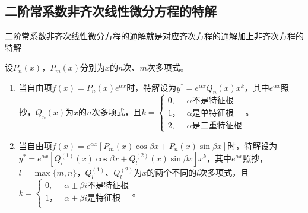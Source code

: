 \documentclass[UTF8, 12pt]{ctexart}
\begin{document}
        \subsection{二阶常系数非齐次线性微分方程的特解}

        二阶常系数非齐次线性微分方程的通解就是对应齐次方程的通解加上非齐次方程的特解

        设$P_n(x)$，$P_m(x)$分别为$x$的$n$次、$m$次多项式。

        \begin{enumerate}
            \item 当自由项$f(x)=P_n(x)e^{\alpha x}$时，特解设为$y^*=e^{\alpha x}Q_n(x)x^k$，其中$e^{\alpha x}$照抄，$Q_n(x)$为$x$的$n$次多项式，且$k=\left\{\begin{array}{ll}
                                                                                                                                                            0, & \alpha\text{不是特征根} \\
                                                                                                                                                            1， & \alpha\text{是单特征根} \\
                                                                                                                                                            2, & \alpha\text{是二重特征根}
            \end{array}\right.$。
            \item 当自由项$f(x)=e^{\alpha x}[P_m(x)\cos\beta x+P_n(x)\sin\beta x]$时，特解设为$y^*=e^{\alpha x}[Q_l^{(1)}(x)\cos\beta x+Q_l^{(2)}(x)\sin\beta x]x^k$，其中$e^{\alpha x}$照抄，$l=\max\{m,n\}$，$Q_l^{(1)}$、$Q_l^{(2)}$为$x$的两个不同的$l$次多项式，且$k=\left\{\begin{array}{ll}
                                                                                                                                                                                                                                                                               0, & \alpha\pm\beta i\text{不是特征根} \\
                                                                                                                                                                                                                                                                               1， & \alpha\pm\beta i\text{是特征根} \\
            \end{array}\right.$。
        \end{enumerate}
\end{document}
